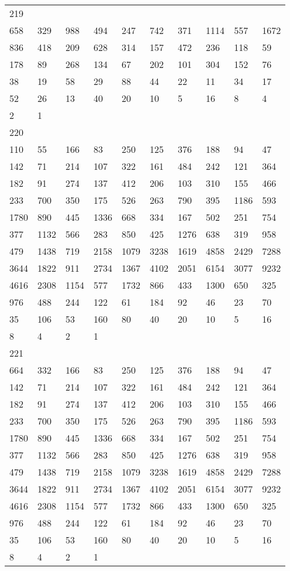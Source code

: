 \begin{longtable}{*{10}{l}}
219&&&&&&&&&\\
658& 329& 988& 494& 247& 742& 371& 1114& 557& 1672\\
836& 418& 209& 628& 314& 157& 472& 236& 118& 59\\
178& 89& 268& 134& 67& 202& 101& 304& 152& 76\\
38& 19& 58& 29& 88& 44& 22& 11& 34& 17\\
52& 26& 13& 40& 20& 10& 5& 16& 8& 4\\
2& 1& \\

220&&&&&&&&&\\
110& 55& 166& 83& 250& 125& 376& 188& 94& 47\\
142& 71& 214& 107& 322& 161& 484& 242& 121& 364\\
182& 91& 274& 137& 412& 206& 103& 310& 155& 466\\
233& 700& 350& 175& 526& 263& 790& 395& 1186& 593\\
1780& 890& 445& 1336& 668& 334& 167& 502& 251& 754\\
377& 1132& 566& 283& 850& 425& 1276& 638& 319& 958\\
479& 1438& 719& 2158& 1079& 3238& 1619& 4858& 2429& 7288\\
3644& 1822& 911& 2734& 1367& 4102& 2051& 6154& 3077& 9232\\
4616& 2308& 1154& 577& 1732& 866& 433& 1300& 650& 325\\
976& 488& 244& 122& 61& 184& 92& 46& 23& 70\\
35& 106& 53& 160& 80& 40& 20& 10& 5& 16\\
8& 4& 2& 1& \\

221&&&&&&&&&\\
664& 332& 166& 83& 250& 125& 376& 188& 94& 47\\
142& 71& 214& 107& 322& 161& 484& 242& 121& 364\\
182& 91& 274& 137& 412& 206& 103& 310& 155& 466\\
233& 700& 350& 175& 526& 263& 790& 395& 1186& 593\\
1780& 890& 445& 1336& 668& 334& 167& 502& 251& 754\\
377& 1132& 566& 283& 850& 425& 1276& 638& 319& 958\\
479& 1438& 719& 2158& 1079& 3238& 1619& 4858& 2429& 7288\\
3644& 1822& 911& 2734& 1367& 4102& 2051& 6154& 3077& 9232\\
4616& 2308& 1154& 577& 1732& 866& 433& 1300& 650& 325\\
976& 488& 244& 122& 61& 184& 92& 46& 23& 70\\
35& 106& 53& 160& 80& 40& 20& 10& 5& 16\\
8& 4& 2& 1& \\


\end{longtable}
